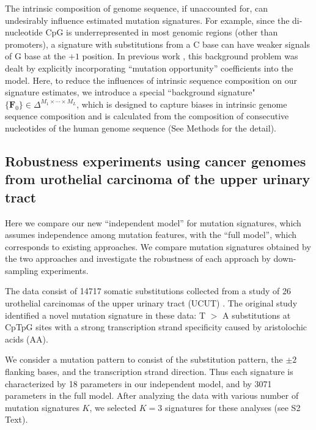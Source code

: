 \documentclass[10pt,letterpaper]{article}
\begin{document}
The intrinsic composition of genome sequence, if unaccounted for, can undesirably influence estimated mutation signatures.
For example, since the di-nucleotide CpG is underrepresented in most genomic regions (other than promoters), 
a signature with substitutions from a C base can have weaker signals of G base at the $+1$ position.
In previous work \cite{pmid23628380}, this background problem was dealt by explicitly incorporating ``mutation opportunity'' coefficients into the model.
Here, to reduce the influences of intrinsic sequence composition on our signature estimates, we introduce a special ``background signature"
$\{ \bm{F}_{0} \} \in \Delta^{M_1 \times \cdots \times M_L}$, 
which is designed to capture biases in intrinsic genome sequence composition and is calculated from the composition of consecutive nucleotides of the human genome sequence 
(See Methods for the detail).




\subsection*{Robustness experiments using cancer genomes from urothelial carcinoma of the upper urinary tract}

Here we compare our new ``independent model'' for 
mutation signatures, which assumes independence
among mutation features,
with the ``full model'', which corresponds to existing approaches. We compare mutation signatures obtained by the two approaches and investigate the robustness of each approach by down-sampling experiments.

The data consist of 14717 somatic substitutions 
collected from a study of 26 urothelial carcinomas of the upper urinary tract (UCUT) \cite{pmid23926200}.
The original study identified a novel mutation signature in these data: 
T $>$ A substitutions at CpTpG sites with a strong transcription strand specificity caused by aristolochic acids (AA).

We consider a mutation pattern to consist of the substitution pattern, the $\pm 2$ flanking bases, and the transcription strand direction. Thus each signature is characterized by 18 parameters in our independent model, and by 3071 parameters in the full model. After analyzing the data with various number of mutation signatures $K$,
we selected $K=3$ signatures for these analyses (see S2 Text).
\end{document}
